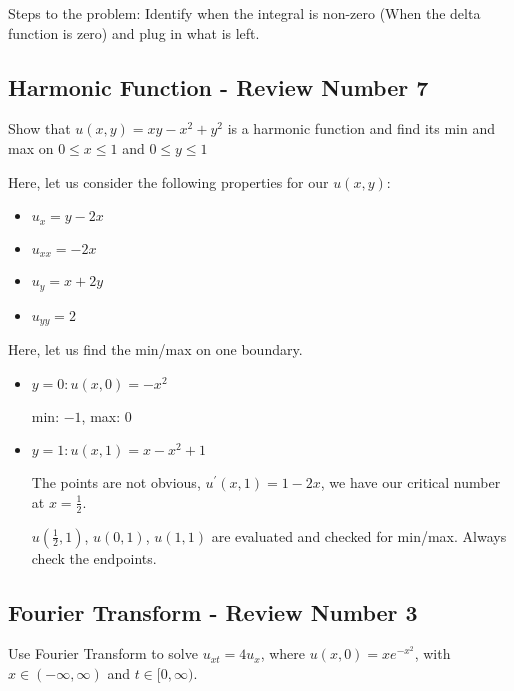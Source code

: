 Steps to the problem: Identify when the integral is non-zero (When the delta function is zero) and plug in what is left.

\subsection*{Harmonic Function - Review Number 7}

Show that $u(x, y) = xy - x^2 + y^2$ is a harmonic function and find its min and max on $0 \leq x \leq 1$ and $0 \leq y \leq 1$

Here, let us consider the following properties for our $u(x, y)$:
%
\begin{itemize}
  \item $u_x = y - 2x$
  \item $u_{xx} = -2x$
  \item $u_y = x + 2y$
  \item $u_{yy} = 2$
\end{itemize}

Here, let us find the min/max on one boundary.
\begin{itemize}
  \item $y = 0 : u(x, 0) = -x^2$

  min: $-1$, max: $0$
  \item $y = 1 : u(x, 1) = x - x^2 + 1$

  The points are not obvious, $u^\prime(x, 1) = 1 - 2x$, we have our critical number at $x = \frac{1}{2}$.

  $u(\frac{1}{2}, 1)$, $u(0, 1)$, $u(1, 1)$ are evaluated and checked for min/max. Always check the endpoints.
\end{itemize}

\subsection*{Fourier Transform - Review Number 3}

Use Fourier Transform to solve $u_{xt} = 4u_x$, where $u(x, 0) = xe^{-x^2}$, with $x \in (-\infty, \infty)$ and $t \in [0, \infty)$.

